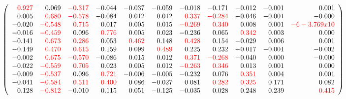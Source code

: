 \documentclass[]{article}
\begin{document}
\[
\left(
\begin{array}{rrrrrrrrrrr}
\color{red} 0.927 & 0.069 & \color{red} -0.317 & -0.044 & -0.037 & -0.059 & -0.018 & -0.171 & -0.012 & -0.001 & 0.001 \\
0.005 & \color{red} 0.680 & \color{red} -0.578 & -0.084 & 0.012 & 0.012 & \color{red} 0.337 & \color{red} -0.284 & -0.046 & -0.001 & -0.000 \\
-0.020 & \color{red} -0.548 & \color{red} 0.715 & 0.017 & 0.005 & 0.015 & \color{red} -0.269 & \color{red} 0.340 & 0.008 & 0.001 & \color{red}            -6
-3.769 x 10 \\
-0.016 & \color{red} -0.459 & 0.096 & \color{red} 0.776 & 0.005 & 0.023 & -0.236 & 0.065 & \color{red} 0.342 & 0.003 & 0.000 \\
-0.141 & \color{red} 0.673 & \color{red} 0.286 & 0.053 & \color{red} 0.462 & 0.148 & \color{red} 0.428 & 0.154 & -0.029 & 0.006 & 0.001 \\
-0.149 & \color{red} 0.470 & \color{red} 0.615 & 0.159 & 0.099 & \color{red} 0.489 & 0.225 & 0.232 & -0.017 & -0.001 & -0.002 \\
-0.002 & \color{red} 0.675 & \color{red} -0.570 & -0.086 & 0.015 & 0.012 & \color{red} 0.371 & \color{red} -0.268 & -0.040 & 0.000 & -0.000 \\
-0.022 & \color{red} -0.559 & \color{red} 0.705 & 0.023 & 0.005 & 0.012 & \color{red} -0.263 & \color{red} 0.346 & 0.013 & 0.001 & 0.000 \\
-0.009 & \color{red} -0.537 & 0.096 & \color{red} 0.721 & -0.006 & -0.005 & -0.232 & 0.076 & \color{red} 0.351 & 0.004 & 0.001 \\
-0.041 & \color{red} -0.584 & \color{red} 0.511 & \color{red} 0.400 & 0.086 & -0.027 & 0.081 & \color{red} 0.282 & \color{red} 0.325 & 0.171 & 0.082 \\
0.128 & \color{red} -0.812 & -0.010 & 0.115 & 0.051 & -0.125 & -0.035 & 0.028 & 0.248 & 0.239 & \color{red} 0.415 \\
\end{array}
\right)
\]
\end{document}
